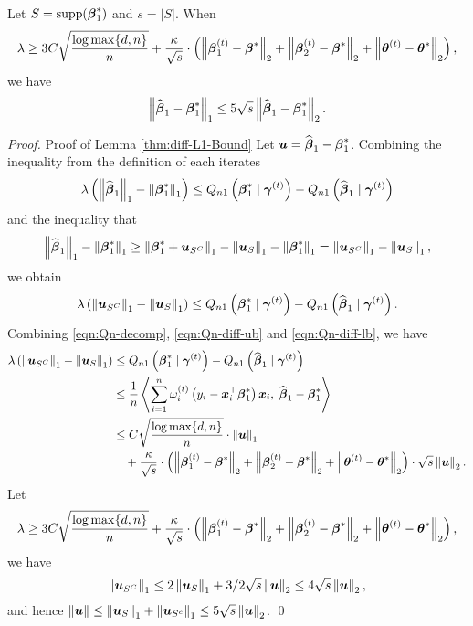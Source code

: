 \begin{lemma} \label{thm:diff-L1-Bound}
Let $S = {\rm supp}(\bbeta_1^*)$ and $s=|S|$. When \[\lambda\ge 3C\sqrt{\frac{\log \max\{d, n\}}{ n}} + \frac{\kappa}{\sqrt{s}}\cdot\paren{\norm{\bbeta_1^{(t)} - \bbeta^*}_2 + \norm{\bbeta_2^{(t)} - \bbeta^*}_2 + \norm{\btheta^{(t)} - \btheta^*}_2},\] we have
\begin{equation}
\norm{ \hat\bbeta_1 - \bbeta_1^*}_1 \leq 5\sqrt{s}\norm{ \hat\bbeta_1 - \bbeta_1^*}_2. 
\end{equation}
\end{lemma}
\begin{proof}{Proof of Lemma \ref{thm:diff-L1-Bound}}
Let $\bu = \hat\bbeta_1 - \bbeta_1^*$. Combining the inequality from the definition of each iterates
\begin{equation} 
\lambda\paren{\norm{\hat\bbeta_1}_1-\norm{\bbeta_1^*}_1} 
\le Q_{n1}\paren{{\bbeta_1^*} \cond \bgamma^{(t)}} - Q_{n1}\paren{\hat\bbeta_1 \cond \bgamma^{(t)}} 
\end{equation}
and the inequality that
\begin{equation*}
\norm{\hat\bbeta_1}_1-\norm{\bbeta_1^*}_1 
\ge \norm{\bbeta_1^* + \bu_{S^C}}_1 - \norm{\bu_{S}}_1-\norm{\bbeta_1^*}_1
= \norm{\bu_{S^C}}_1 - \norm{\bu_{S}}_1,
\end{equation*}
we obtain
\begin{equation} \label{eqn:Qn-diff-lb}
\lambda\paren{\norm{\bu_{S^C}}_1 - \norm{\bu_{S}}_1}
\le 
Q_{n1}\paren{{\bbeta_1^*} \cond \bgamma^{(t)}} - Q_{n1}\paren{\hat\bbeta_1 \cond \bgamma^{(t)}}.
\end{equation}
Combining \eqref{eqn:Qn-decomp}, \eqref{eqn:Qn-diff-ub} and \eqref{eqn:Qn-diff-lb}, we have 
\begin{align*}
\lambda\paren{\norm{\bu_{S^C}}_1 - \norm{\bu_{S}}_1}
& \le Q_{n1}\paren{{\bbeta_1^*} \cond \bgamma^{(t)}} - Q_{n1}\paren{\hat\bbeta_1 \cond \bgamma^{(t)}} \\
& \le \frac{1}{n}\angles{\sum_{i=1}^{n}\omega_i^{(t)}\paren{y_i-\bx_i^\top\bbeta_1^*} \bx_i,\; \hat\bbeta_1-\bbeta_1^*} \\
& \le 
C \sqrt{\frac{\log \max\{d, n\}} {n}}\cdot\norm{\bu}_1 \\
&\quad + \frac{\kappa}{\sqrt{s}}\cdot\paren{\norm{\bbeta_1^{(t)} - \bbeta^*}_2 + \norm{\bbeta_2^{(t)} - \bbeta^*}_2 + \norm{\btheta^{(t)} - \btheta^*}_2}\cdot\sqrt{s}\norm{\bu}_2. 
\end{align*} 
Let \[\lambda\ge 3C\sqrt{\frac{\log \max\{d, n\}}{ n}} + \frac{\kappa}{\sqrt{s}}\cdot\paren{\norm{\bbeta_1^{(t)} - \bbeta^*}_2 + \norm{\bbeta_2^{(t)} - \bbeta^*}_2 + \norm{\btheta^{(t)} - \btheta^*}_2},\] we have
\begin{equation*}
\norm{\bu_{S^C}}_1 \le 2\norm{\bu_{S}}_1 + 3/2\sqrt{s}\norm{\bu}_2 \le 4\sqrt{s}\norm{\bu}_2,
\end{equation*}
and hence $\norm{\bu} \leq \norm{\bu_{S}}_1+\norm{\bu_{S^c}}_1 \leq 5\sqrt{s}\norm{\bu}_2$. \hfill\qed
\end{proof}

